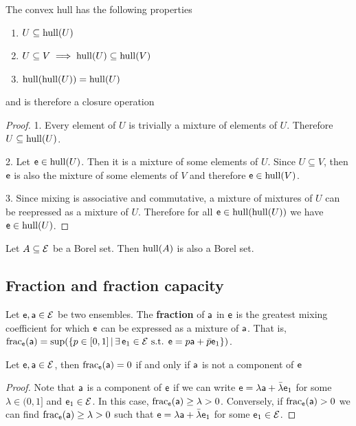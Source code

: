 \begin{coro}
	The convex hull has the following properties
	\begin{enumerate}
		\item $U \subseteq \hull(U)$
		\item $U \subseteq V \implies \hull(U) \subseteq \hull(V)$
		\item $\hull(\hull(U)) = \hull(U)$
	\end{enumerate}
	and is therefore a closure operation
\end{coro}

\begin{proof}
	1. Every element of $U$ is trivially a mixture of elements of $U$. Therefore $U \subseteq \hull(U)$.
	
	2. Let $\ens \in \hull(U)$. Then it is a mixture of some elements of $U$. Since $U \subseteq V$, then $\ens$ is also the mixture of some elements of $V$ and therefore $\ens \in \hull(V)$.
	
	3. Since mixing is associative and commutative, a mixture of mixtures of $U$ can be reepressed as a mixture of $U$. Therefore for all $\ens \in \hull(\hull(U))$ we have $\ens \in \hull(U)$.
\end{proof}

\begin{conj}
	Let $A \subseteq \Ens$ be a Borel set. Then $\hull(A)$ is also a Borel set.
\end{conj}

\subsection{Fraction and fraction capacity}

\begin{defn}
	Let $\ens, \ens[a] \in \Ens$ be two ensembles. The \textbf{fraction} of $\ens[a]$ in $\ens$ is the greatest mixing coefficient for which $\ens$ can be expressed as a mixture of $\ens[a]$. That is, $\size_{\ens}(\ens[a]) = \sup(\{ p \in [0,1] \, | \, \exists \, \ens_1 \in \Ens \text{ s.t. }  \ens = p \ens[a] + \bar{p} \ens_1 \})$.
\end{defn}

\begin{coro}
	Let $\ens, \ens[a] \in \Ens$, then $\size_{\ens}(\ens[a]) = 0$ if and only if $\ens[a]$ is not a component of $\ens$
\end{coro}

\begin{proof}
	Note that $\ens[a]$ is a component of $\ens$ if we can write $\ens = \lambda \ens[a] + \bar{\lambda} \ens_1$ for some $\lambda \in (0,1]$ and $\ens_1 \in \Ens$. In this case, $\size_{\ens}(\ens[a]) \geq \lambda > 0$. Conversely, if $\size_{\ens}(\ens[a]) > 0$ we can find $\size_{\ens}(\ens[a]) \geq \lambda > 0$ such that $\ens = \lambda \ens[a] + \bar{\lambda} \ens_1$ for some $\ens_1 \in \Ens$.
\end{proof}

